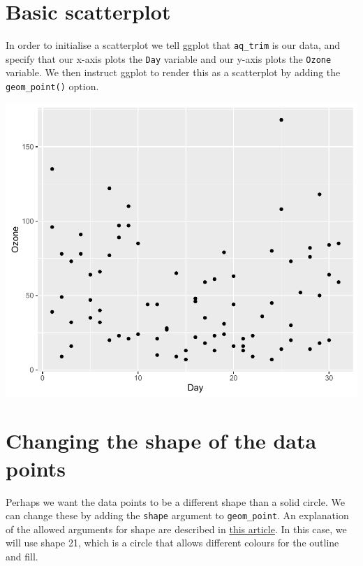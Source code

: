 \section{Basic scatterplot}\label{basic-scatterplot}

In order to initialise a scatterplot we tell ggplot that
\texttt{aq\_trim} is our data, and specify that our x-axis plots the
\texttt{Day} variable and our y-axis plots the \texttt{Ozone} variable.
We then instruct ggplot to render this as a scatterplot by adding the
\texttt{geom\_point()} option.

\begin{Shaded}
\begin{Highlighting}[]
\StringTok{ }\NormalTok{(}  \StringTok{ }
\StringTok{  }\NormalTok{()}
\end{Highlighting}
\end{Shaded}

\begin{center}\includegraphics[width=0.6\linewidth]{5_Scatter_Plots_pdf/scatter_1-1} \end{center}

\section{Changing the shape of the data
points}\label{changing-the-shape-of-the-data-points}

Perhaps we want the data points to be a different shape than a solid
circle. We can change these by adding the \texttt{shape} argument to
\texttt{geom\_point}. An explanation of the allowed arguments for shape
are described in
\href{http://sape.inf.usi.ch/quick-reference/ggplot2/shape}{this
article}. In this case, we will use shape 21, which is a circle that
allows different colours for the outline and fill.

